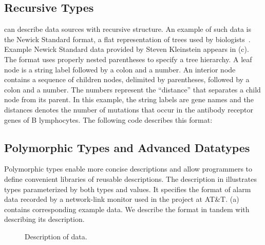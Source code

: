 \documentclass{sigplanconf}
\begin{document}
\subsection{Recursive Types}

\padsml{} can describe data sources with recursive structure.  An
example of such data is the Newick Standard format, a flat representation
of trees used by biologists~\cite{newick}.
Example Newick Standard data provided by Steven Kleinstein appears in
(c). 
The format uses properly nested
parentheses to specify a tree hierarchy.  A leaf node is a string
label followed by a colon and a number.  An interior node contains a
sequence of children nodes, delimited by parentheses, followed by a
colon and a number.  The numbers represent the ``distance'' that
separates a child node from its parent. 
In this example,  the string labels are gene names and the distances denotes the number of mutations that occur in the antibody receptor genes of B lymphocytes. 
The following \padsml{} code 
describes this format:

 

\subsection{Polymorphic Types and Advanced Datatypes}

Polymorphic types enable more concise descriptions and allow
programmers to define convenient libraries of reusable descriptions. The
description in  illustrates types
parameterized by both types and values.  It specifies
the format of alarm data recorded by a network-link monitor used in
the \darkstar{} project at AT\&T.  (a) contains corresponding example data. We describe the format in tandem with describing its \padsml{} description.
\begin{figure}
  \centering
  
  \caption{Description of \darkstar{} data.}
  \label{fig:darkstar-ml}
\end{figure}
\end{document}
